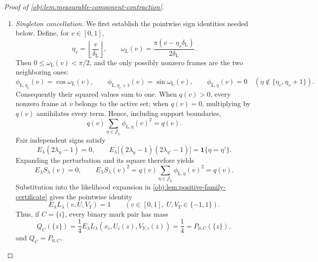 \documentclass[11pt]{article}
\begin{document}
\begin{proof}[Proof of \cref{obj:lem:measurable-component-contraction}]
\begin{enumerate}
Distinct components have disjoint sign sets:
\[
C,C'\in\mathscr C(x),\ C\ne C'
\quad\Longrightarrow\quad
J_C(x)\cap J_{C'}(x)=\varnothing.
\]
Indeed, a common sign would be used by a vertex in each component and would join them by an edge. Since the signs are independent and fair, summing separately over these disjoint sign blocks gives
\[
E_\lambda\prod_{i=1}^n
 \frac{L_\lambda(x_i,U_i(z),V_{Y,i}(z))}{4}
=
\prod_{C\in\mathscr C(x)}
 E_\lambda\prod_{i\in C}
 \frac{L_\lambda(x_i,U_i(z),V_{Y,i}(z))}{4}
=
\prod_{C\in\mathscr C(x)}Q_C(\{z|_C\}).
\]
Unused signs average to one. The component vertex sets partition the record indices, so
\[
4^{-n}
=
\prod_{C\in\mathscr C(x)}4^{-|C|}
=
\prod_{C\in\mathscr C(x)}P_{0,C}(\{z|_C\}).
\]
Both identities also hold for \(n=0\), with empty products equal to one.

\item \textit{Singleton cancellation.}
We first establish the pointwise sign identities needed below. Define, for \(v\in[0,1]\),
\[
\eta_v=\left\lfloor\frac{v}{\delta_{\mathrm L}}\right\rfloor,
\qquad
\omega_{\mathrm L}(v)
=\frac{\pi(v-\eta_v\delta_{\mathrm L})}{2\delta_{\mathrm L}}.
\]
Then \(0\le\omega_{\mathrm L}(v)<\pi/2\), and the only possibly nonzero frames are the two neighboring ones:
\[
\phi_{\mathrm L,\eta_v}(v)=\cos\omega_{\mathrm L}(v),
\qquad
\phi_{\mathrm L,\eta_v+1}(v)=\sin\omega_{\mathrm L}(v),
\qquad
\phi_{\mathrm L,\eta}(v)=0
\quad(\eta\notin\{\eta_v,\eta_v+1\}).
\]
Consequently their squared values sum to one. When \(q(v)>0\), every nonzero frame at \(v\) belongs to the active set; when \(q(v)=0\), multiplying by \(q(v)\) annihilates every term. Hence, including support boundaries,
\[
q(v)\sum_{\eta\in\mathcal J_{\mathrm L}}
 \phi_{\mathrm L,\eta}(v)^2=q(v).
\]
Fair independent signs satisfy
\[
E_\lambda(2\lambda_\eta-1)=0,
\qquad
E_\lambda\bigl[(2\lambda_\eta-1)(2\lambda_{\eta'}-1)\bigr]
=\mathbf 1\{\eta=\eta'\}.
\]
Expanding the perturbation and its square therefore yields
\[
E_\lambda S_\lambda(v)=0,
\qquad
E_\lambda S_\lambda(v)^2
=
q(v)\sum_{\eta\in\mathcal J_{\mathrm L}}\phi_{\mathrm L,\eta}(v)^2
=q(v).
\]
Substitution into the likelihood expansion in
\cref{obj:lem:positive-family-certificate} gives the pointwise identity
\[
E_\lambda L_\lambda(v,U,V_Y)=1
\qquad
(v\in[0,1],\ U,V_Y\in\{-1,1\}).
\]
Thus, if \(C=\{i\}\), every binary mark pair has mass
\[
Q_C(\{z\})
=\frac14E_\lambda L_\lambda(x_i,U_i(z),V_{Y,i}(z))
=\frac14
=P_{0,C}(\{z\}),
\]
and \(Q_C=P_{0,C}\).


\end{enumerate}
\end{proof}
\end{document}
